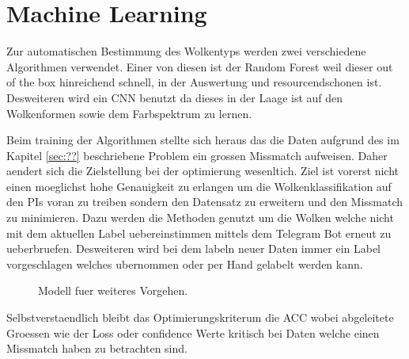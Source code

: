 \section{Machine Learning}

Zur automatischen Bestimmung des Wolkentyps werden zwei verschiedene Algorithmen
verwendet. 
Einer von diesen ist der Random Forest weil dieser out of the box hinreichend schnell,
in der Auswertung und resourcendschonen ist.
Desweiteren wird ein CNN benutzt da dieses in der Laage ist auf den Wolkenformen
sowie dem Farbspektrum zu lernen. 

Beim training der Algorithmen stellte sich heraus das die Daten aufgrund des im
Kapitel \ref{sec:??} beschriebene Problem ein grossen Missmatch aufweisen. 
Daher aendert sich die Zielstellung bei der optimierung wesenltich.
Ziel ist vorerst nicht einen moeglichst hohe Genauigkeit zu erlangen um die
Wolkenklassifikation auf den PIs voran zu treiben sondern den Datensatz zu
erweitern und den Missmatch zu minimieren.
Dazu werden die Methoden genutzt um die Wolken welche nicht mit dem aktuellen
Label uebereinstimmen mittels dem Telegram Bot erneut zu ueberbruefen.
Desweiteren wird bei dem labeln neuer Daten immer ein Label vorgeschlagen
welches ubernommen oder per Hand gelabelt werden kann.
\begin{figure}
		\centering
{}
		\caption{Modell fuer weiteres Vorgehen.}
		\label{fig:}
\end{figure}

Selbstverstaendlich bleibt das Optimierungskriterum die ACC wobei abgeleitete
Groessen wie der Loss oder confidence Werte kritisch bei Daten welche einen
Missmatch haben zu betrachten sind.

